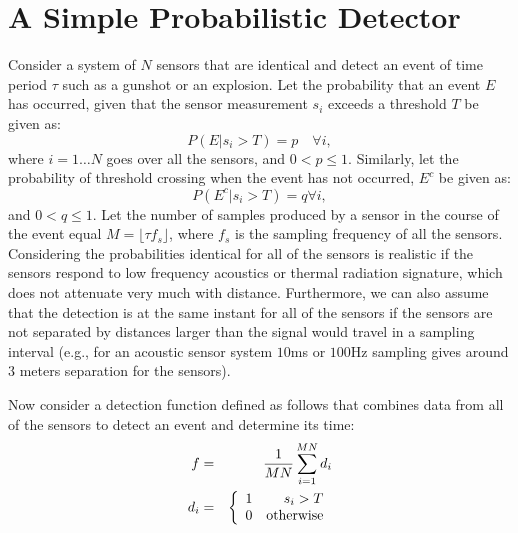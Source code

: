 \section{A Simple Probabilistic Detector}\label{sec:detector}
Consider a system of $N$ sensors that are identical and detect an
event of time period $\tau$ such as a gunshot or an explosion. Let
the probability that an event $E$ has occurred, given that the
sensor measurement $s_i$ exceeds a threshold $T$ be given as:
\begin{equation}
P(E|s_i>T)=p \quad \forall i\label{eqn:detrate},
\end{equation}
where $i=1\ldots N$ goes over all the sensors, and $0<p\leq 1$.
Similarly, let the probability of threshold crossing when the
event has not occurred, $E^c$ be given as:
\begin{equation}
P(E^c|s_i>T)=q \forall i\label{eqn:fprate},
\end{equation}
and $0<q\leq 1$. Let the number of samples produced by a sensor in
the course of the event equal $M=\lfloor \tau f_s \rfloor$, where
$f_s$ is the sampling frequency of all the sensors. Considering
the probabilities identical for all of the sensors is realistic if
the sensors respond to low frequency acoustics or thermal
radiation signature, which does not attenuate very much with
distance. Furthermore, we can also assume that the detection is at
the same instant for all of the sensors if the sensors are not
separated by distances larger than the signal would travel in a
sampling interval (e.g., for an acoustic sensor system $10$ms or
$100$Hz sampling gives around $3$ meters separation for the
sensors).

Now consider a detection function defined as follows that combines
data from all of the sensors to detect an event and determine its
time:
\begin{eqnarray}
  f &=& {1\over MN}\sum_{i=1}^{MN}d_i\label{eqn:detector} \\
  d_i &=&\left\{\begin{array}{lr}
  1 & s_i>T\\
  0 & {\rm otherwise}\end{array}\right.
\end{eqnarray}

